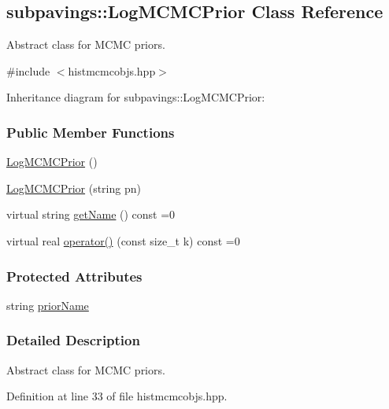 \hypertarget{classsubpavings_1_1LogMCMCPrior}{\subsection{subpavings\-:\-:\-Log\-M\-C\-M\-C\-Prior \-Class \-Reference}
\label{classsubpavings_1_1LogMCMCPrior}
}


\-Abstract class for \-M\-C\-M\-C priors.  




{\ttfamily \#include $<$histmcmcobjs.\-hpp$>$}



\-Inheritance diagram for subpavings\-:\-:\-Log\-M\-C\-M\-C\-Prior\-:
\subsubsection*{\-Public \-Member \-Functions}
\begin{DoxyCompactItemize}
\item 
\hyperlink{classsubpavings_1_1LogMCMCPrior_a6c3e7fab7f47501de8e5577c20a93e22}{\-Log\-M\-C\-M\-C\-Prior} ()
\item 
\hyperlink{classsubpavings_1_1LogMCMCPrior_ad3d0c5e29c3a14d86902e90256cbdd97}{\-Log\-M\-C\-M\-C\-Prior} (string pn)
\item 
virtual string \hyperlink{classsubpavings_1_1LogMCMCPrior_ace14dfa0a28927d063d091e13f9ead1c}{get\-Name} () const =0
\item 
virtual real \hyperlink{classsubpavings_1_1LogMCMCPrior_ae53e146f9ac1b057ae9df4370220a22d}{operator()} (const size\-\_\-t k) const =0
\end{DoxyCompactItemize}
\subsubsection*{\-Protected \-Attributes}
\begin{DoxyCompactItemize}
\item 
string \hyperlink{classsubpavings_1_1LogMCMCPrior_a56c878a215bc9b7fb54871a3c0f6dc44}{prior\-Name}
\end{DoxyCompactItemize}


\subsubsection{\-Detailed \-Description}
\-Abstract class for \-M\-C\-M\-C priors. 

\-Definition at line 33 of file histmcmcobjs.\-hpp.



